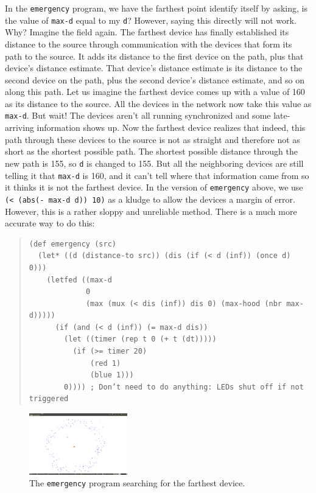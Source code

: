 \documentclass{article}
\newcommand\var[1]{{\tt #1}}
\begin{document}
In the \var{emergency} program, we have the farthest point identify
itself by asking, is the value of \var{max-d} equal to my \var{d}?
However, saying this directly will not work.  Why?  Imagine the field
again. The farthest device has finally established its distance to the
source through communication with the devices that form its path to
the source.  It adds its distance to the first device on the path,
plus that device's distance estimate.  That device's distance estimate
is its distance to the second device on the path, plus the second
device's distance estimate, and so on along this path.  Let us imagine
the farthest device comes up with a value of 160 as its distance to
the source.  All the devices in the network now take this value as
\var{max-d}.  But wait!  The devices aren't all running synchronized
and some late-arriving information shows up.  Now the farthest device
realizes that indeed, this path through these devices to the source is
not as straight and therefore not as short as the shortest possible
path.  The shortest possible distance through the new path is 155, so
\var{d} is changed to 155.  But all the neighboring devices are still
telling it that \var{max-d} is 160, and it can't tell where that
information came from so it thinks it is not the farthest device.  In
the version of \var{emergency} above, we use \var{(< (abs(- max-d d))
  10)} as a kludge to allow the devices a margin of error.  However,
this is a rather sloppy and unreliable method.  There is a much more
accurate way to do this:

\begin{quote}
\begin{verbatim}
(def emergency (src) 
  (let* ((d (distance-to src)) (dis (if (< d (inf)) (once d) 0))) 
    (letfed ((max-d 
             0 
             (max (mux (< dis (inf)) dis 0) (max-hood (nbr max-d)))))
      (if (and (< d (inf)) (= max-d dis))
        (let ((timer (rep t 0 (+ t (dt)))))
          (if (>= timer 20) 
              (red 1) 
              (blue 1)))
        0)))) ; Don’t need to do anything: LEDs shut off if not triggered
\end{verbatim}
\end{quote}

\begin{figure}
  \includegraphics[width=0.38\textwidth]{figures/emergency.png}
  \caption{The \var{emergency} program searching for the farthest device.}
  \vspace{-0.5cm}
  \label{f:emergency}
\end{figure}
\end{document}
